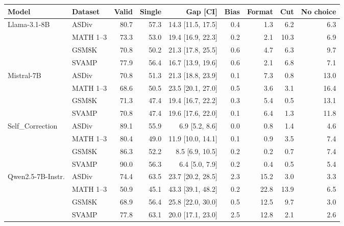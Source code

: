 \begin{tabular}{llrrrrrrr}
\toprule
Model & Dataset & Valid & Single & Gap [CI] & Bias & Format & Cut & No choice \\
\midrule
Llama-3.1-8B & ASDiv & 80.7 & 57.3 & 14.3 [11.5, 17.5] & 0.4 & 1.3 & 6.2 & 6.3 \\
 & MATH 1--3 & 73.3 & 53.0 & 19.4 [16.9, 22.3] & 0.2 & 2.1 & 10.3 & 6.9 \\
 & GSM8K & 70.8 & 50.2 & 21.3 [17.8, 25.5] & 0.6 & 4.7 & 6.3 & 9.7 \\
 & SVAMP & 77.9 & 56.4 & 16.7 [13.9, 19.6] & 0.6 & 2.1 & 6.8 & 7.1 \\
Mistral-7B & ASDiv & 70.8 & 51.3 & 21.3 [18.8, 23.9] & 0.1 & 7.3 & 0.8 & 13.0 \\
 & MATH 1--3 & 68.6 & 50.5 & 23.5 [20.1, 27.0] & 0.5 & 3.6 & 3.1 & 16.4 \\
 & GSM8K & 71.3 & 47.4 & 19.4 [16.7, 22.2] & 0.3 & 5.4 & 0.5 & 13.1 \\
 & SVAMP & 70.8 & 47.4 & 19.6 [17.6, 22.0] & 0.1 & 6.4 & 1.3 & 11.8 \\
Self\_Correction & ASDiv & 89.1 & 55.9 & 6.9 [5.2, 8.6] & 0.0 & 0.8 & 1.4 & 4.6 \\
 & MATH 1--3 & 80.4 & 49.0 & 11.9 [10.0, 14.1] & 0.1 & 0.9 & 3.5 & 7.4 \\
 & GSM8K & 86.3 & 52.2 & 8.5 [6.9, 10.5] & 0.2 & 0.2 & 0.7 & 7.4 \\
 & SVAMP & 90.0 & 56.3 & 6.4 [5.0, 7.9] & 0.2 & 0.4 & 0.5 & 5.4 \\
Qwen2.5-7B-Instr. & ASDiv & 74.4 & 63.5 & 23.7 [20.2, 28.5] & 2.3 & 15.2 & 3.0 & 3.3 \\
 & MATH 1--3 & 50.9 & 45.1 & 43.3 [39.1, 48.2] & 0.2 & 22.8 & 13.9 & 6.5 \\
 & GSM8K & 68.9 & 56.4 & 25.8 [22.0, 30.0] & 0.5 & 12.5 & 9.7 & 3.0 \\
 & SVAMP & 77.8 & 63.1 & 20.0 [17.1, 23.0] & 2.5 & 12.8 & 2.1 & 2.6 \\
\bottomrule
\end{tabular}
